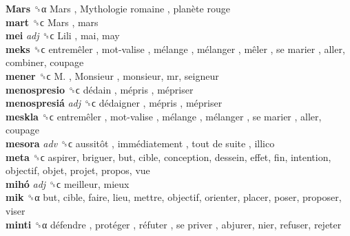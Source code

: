 \textbf{Mars} ␝α   Mars ,  Mythologie romaine ,  planète rouge   \\
\textbf{mart} ␝ϲ   Mars , mars  \\
\textbf{mei} \emph{adj}  ␝ϲ   Lili , mai, may  \\
\textbf{meks} ␝ϲ   entremêler ,  mot-valise ,  mélange ,  mélanger ,  mêler ,  se marier , aller, combiner, coupage  \\
\textbf{mener} ␝ϲ   M. ,  Monsieur , monsieur, mr, seigneur  \\
\textbf{menospresio} ␝ϲ   dédain ,  mépris ,  mépriser   \\
\textbf{menospresiá} \emph{adj}  ␝ϲ   dédaigner ,  mépris ,  mépriser   \\
\textbf{meskla} ␝ϲ   entremêler ,  mot-valise ,  mélange ,  mélanger ,  se marier , aller, coupage  \\
\textbf{mesora} \emph{adv}  ␝ϲ   aussitôt ,  immédiatement ,  tout de suite , illico  \\
\textbf{meta} ␝ϲ  aspirer, briguer, but, cible, conception, dessein, effet, fin, intention, objectif, objet, projet, propos, vue  \\
\textbf{mihó} \emph{adj}  ␝ϲ  meilleur, mieux  \\
\textbf{mik} ␝α  but, cible, faire, lieu, mettre, objectif, orienter, placer, poser, proposer, viser  \\
\textbf{minti} ␝α   défendre ,  protéger ,  réfuter ,  se priver , abjurer, nier, refuser, rejeter  \\
